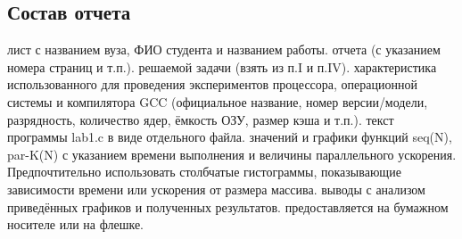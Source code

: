 { %
	\subsection{Состав отчета}
	\begin{enumerate}
		 лист с названием вуза, ФИО студента и названием работы.
		 отчета (с указанием номера страниц и т.п.).
		 решаемой задачи (взять из п.I и п.IV).
		 характеристика использованного для проведения экспериментов процессора, операционной системы и компилятора GCC (официальное название, номер версии/модели, разрядность, количество ядер, ёмкость ОЗУ, размер кэша и т.п.).
		 текст программы lab1.c в виде отдельного файла.
		 значений и графики функций seq(N), par-K(N) с указанием времени выполнения и величины параллельного ускорения. Предпочтительно использовать столбчатые гистограммы, показывающие зависимости времени или ускорения от размера массива.
		 выводы с анализом приведённых графиков и полученных результатов.
		 предоставляется на бумажном носителе или на флешке.
	\end{enumerate}
}